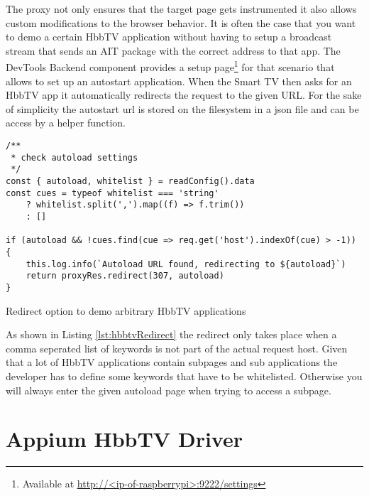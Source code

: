 The proxy not only ensures that the target page gets instrumented it also allows custom modifications to the
browser behavior. It is often the case that you want to demo a certain HbbTV application without having to
setup a broadcast stream that sends an AIT package with the correct address to that app. The DevTools Backend
component provides a setup page\footnote{Available at \url{http://<ip-of-raspberrypi>:9222/settings}} for that scenario
that allows to set up an autostart application. When the Smart TV then asks for an HbbTV app it automatically
redirects the request to the given URL. For the sake of simplicity the autostart url is stored on the filesystem
in a json file and can be access by a helper function.

\begin{listing}[H]
\begin{verbatim}
/**
 * check autoload settings
 */
const { autoload, whitelist } = readConfig().data
const cues = typeof whitelist === 'string'
    ? whitelist.split(',').map((f) => f.trim())
    : []

if (autoload && !cues.find(cue => req.get('host').indexOf(cue) > -1)) {
    this.log.info(`Autoload URL found, redirecting to ${autoload}`)
    return proxyRes.redirect(307, autoload)
}
\end{verbatim}
\caption{Redirect option to demo arbitrary HbbTV applications}
\label{lst:hbbtvRedirect}
\end{listing}

As shown in Listing \ref{lst:hbbtvRedirect} the redirect only takes place when a comma seperated list
of keywords is not part of the actual request host. Given that a lot of HbbTV applications contain subpages
and sub applications the developer has to define some keywords that have to be whitelisted. Otherwise
you will always enter the given autoload page when trying to access a subpage.

\section{Appium HbbTV Driver\label{sec:driver}}

